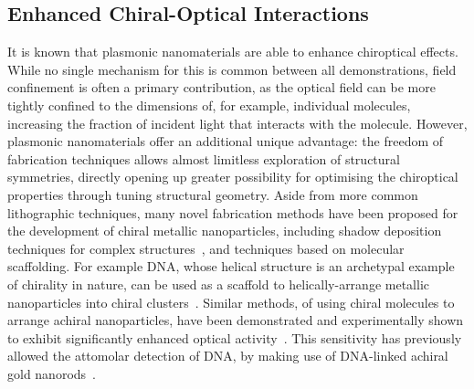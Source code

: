 \subsection{Enhanced Chiral-Optical Interactions} \label{sec:background:Plasmonics:chiralPlasmonics}
It is known that plasmonic nanomaterials are able to enhance chiroptical effects. While no single mechanism for this is common between all demonstrations, field confinement is often a primary contribution, as the optical field can be more tightly confined to the dimensions of, for example, individual molecules, increasing the fraction of incident light that interacts with the molecule. However, plasmonic nanomaterials offer an additional unique advantage: the freedom of fabrication techniques allows almost limitless exploration of structural symmetries, directly opening up greater possibility for optimising the chiroptical properties through tuning structural geometry. Aside from more common lithographic techniques, many novel fabrication methods have been proposed for the development of chiral metallic nanoparticles, including shadow deposition techniques for complex structures~\cite{Mark2013}, and techniques based on molecular scaffolding. For example DNA, whose helical structure is an archetypal example of chirality in nature, can be used as a scaffold to helically-arrange metallic nanoparticles into chiral clusters~\cite{Shen2012}. Similar methods, of using chiral molecules to arrange achiral nanoparticles, have been demonstrated and experimentally shown to exhibit significantly enhanced optical activity~\cite{Knoppe2012a, Knoppe2012, Farrag2016}. This sensitivity has previously allowed the attomolar detection of DNA, by making use of DNA-linked achiral gold nanorods~\cite{Ma2013b}.


